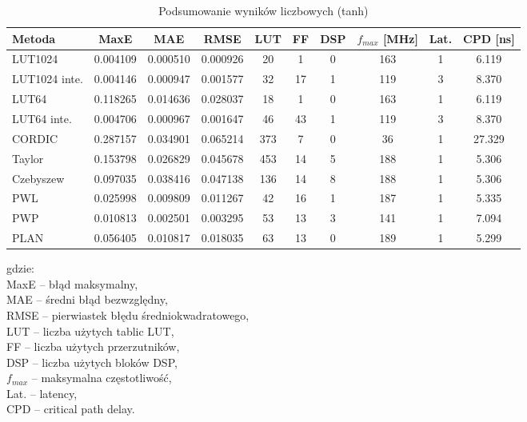 \documentclass[12pt, a4paper, oneside]{scrreprt}
\begin{document}
\begin{table}[H]
    \centering
    \small
    \caption{Podsumowanie wyników liczbowych (tanh)}
    \label{tab:tanh_wyniki}

    \begin{tabular}{lccccccccc}
        \toprule
        Metoda & MaxE & MAE & RMSE & LUT & FF & DSP & $f_{max}$ [MHz] & Lat. & CPD [ns] \\
        \midrule
        LUT1024 & 0.004109 & 0.000510 & 0.000926 & 20 & 1 & 0 & 163 & 1 & 6.119 \\
        LUT1024 inte. & 0.004146 & 0.000947 & 0.001577 & 32 & 17 & 1 & 119 & 3 & 8.370 \\
        LUT64 & 0.118265 & 0.014636 & 0.028037 & 18 & 1 & 0 & 163 & 1 & 6.119 \\
        LUT64 inte. & 0.004706 & 0.000967 & 0.001647 & 46 & 43 & 1 & 119 & 3 & 8.370 \\
        CORDIC & 0.287157 & 0.034901 & 0.065214 & 373 & 7 & 0 & 36 & 1 & 27.329 \\
        Taylor & 0.153798 & 0.026829 & 0.045678 & 453 & 14 & 5 & 188 & 1 & 5.306 \\
        Czebyszew & 0.097035 & 0.038416 & 0.047138 & 136 & 14 & 8 & 188 & 1 & 5.306 \\
        PWL & 0.025998 & 0.009809 & 0.011267 & 42 & 16 & 1 & 187 & 1 & 5.335 \\
        PWP & 0.010813 & 0.002501 & 0.003295 & 53 & 13 & 3 & 141 & 1 & 7.094 \\
        PLAN & 0.056405 & 0.010817 & 0.018035 & 63 & 13 & 0 & 189 & 1 & 5.299 \\
        \bottomrule
    \end{tabular}
    \vspace{1.5em}
    \footnotesize

    gdzie: \\
    MaxE -- błąd maksymalny, \\
    MAE -- średni błąd bezwzględny, \\
    RMSE -- pierwiastek błędu średniokwadratowego, \\
    LUT -- liczba użytych tablic LUT, \\
    FF -- liczba użytych przerzutników, \\
    DSP -- liczba użytych bloków DSP, \\
    $f_{max}$ -- maksymalna częstotliwość, \\
    Lat. -- latency, \\
    CPD -- critical path delay.
\end{table}
\end{document}
